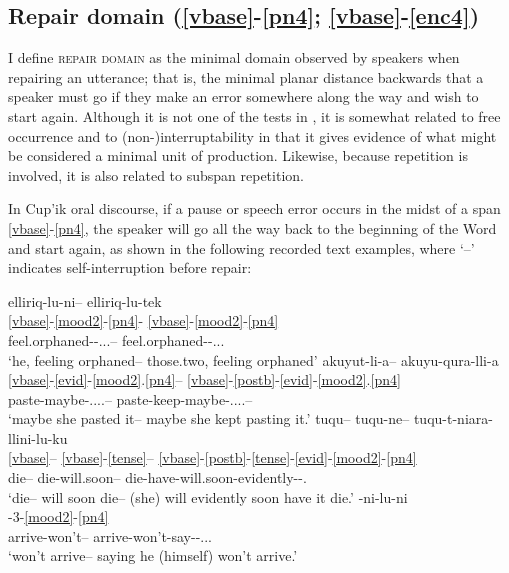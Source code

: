 \documentclass[output=paper]{langscibook}
\begin{document}
\subsection{Repair domain (\ref{vbase}-\ref{pn4}; \ref{vbase}-\ref{enc4})} \label{sec:5.3}

I define \textsc{repair} \textsc{domain} as the minimal domain observed by speakers when repairing an utterance; that is, the minimal planar distance backwards that a speaker must go if they make an error somewhere along the way and wish to start again. Although it is not one of the tests in \citet{Tallman2021}, it is somewhat related to free occurrence and to (non-)interruptability in that it gives evidence of what might be considered a minimal unit of production. Likewise, because repetition is involved, it is also related to subspan repetition.

In Cup'ik oral discourse, if a pause or speech error occurs in the midst of a span \ref{vbase}-\ref{pn4}, the speaker will go all the way back to the beginning of the Word and start again, as shown in the following recorded text examples, where `--' indicates self-interruption before repair:

\ea\label{ex:key:28}
\ea\label{ex:key:28a}
\glll elliriq-lu-ni-- elliriq-lu-tek\\
    \ref{vbase}-\ref{mood2}-\ref{pn4}- \ref{vbase}-\ref{mood2}-\ref{pn4}\\
     feel.orphaned-\Appos-\Third.\Refl.\Sg.\Sarg{}-- feel.orphaned-\Appos-\Third.\Refl.\Du.\Sarg{}\\
\glt `he, feeling orphaned-- those.two, feeling orphaned'
\ex\label{ex:key:28b}
\glll akuyut-li-a-- akuyu-qura-lli-a\\
    \ref{vbase}-\ref{evid}-\ref{mood2}.\ref{pn4}-- \ref{vbase}-\ref{postb}-\ref{evid}-\ref{mood2}.\ref{pn4}\\
     paste-maybe-\Ind{}.\Tsg.\Aarg{}.\Tsg.\Obj{}-- paste-keep-maybe-\Ind{}.\Tsg.\Aarg{}.\Tsg.\Obj{}--\\
\glt `maybe she pasted it-- maybe she kept pasting it.'
\ex\label{ex:key:28c}
\glll tuqu-- tuqu-ne--  tuqu-t-niara-llini-lu-ku\\
    \ref{vbase}-- \ref{vbase}-\ref{tense}-- \ref{vbase}-\ref{postb}-\ref{tense}-\ref{evid}-\ref{mood2}-\ref{pn4} \\
     die-- die-will.soon-- die-have-will.soon-evidently-\Appos-\Tsg.\Obj{}\\
\glt `die-- will soon die-- (she) will evidently soon have it die.'
\ex\label{ex:key:28d}
\glll [tekiy-ngait-- [tekiy-ngait]-ni-lu-ni\\
    [\ref{vbase}-\ref{tense}-- [\ref{vbase}-\ref{tense}-]-3{}-\ref{mood2}-\ref{pn4} \\
     arrive-won't-- arrive-won't-say-\Appos-\Third.\Refl.\Sg.\Sarg{}\\
\glt `won't arrive-- saying he (himself) won't arrive.'
\z
\z
\end{document}
